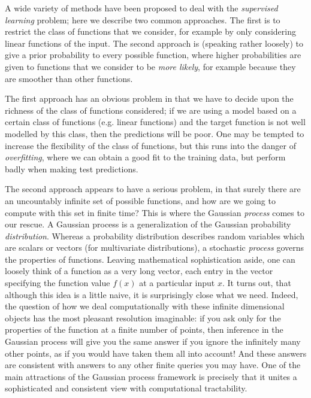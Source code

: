 \documentclass{article} %
\begin{document}
A wide variety of methods have been proposed to deal with the \textit{supervised learning} problem; here we describe two common approaches. The first is to restrict the class of functions that we consider, for example by only considering linear functions of the input. The second approach is (speaking rather loosely) to give a prior probability to every possible function, where higher probabilities are given to functions that we consider to be \textit{more likely}, for example because they are smoother than other functions.

The first approach has an obvious problem in that we have to decide upon the richness of the class of functions considered; if we are using a model based on a certain class of functions (e.g. linear functions) and the target function is not well modelled by this class, then the predictions will be poor. One may be tempted to increase the flexibility of the class of functions, but this runs into the danger of \textit{overfitting}, where we can obtain a good fit to the training data, but perform badly when making test predictions.

The second approach appears to have a serious problem, in that surely there are an uncountably infinite set of possible functions, and how are we going to compute with this set in finite time? This is where the Gaussian \textit{process} comes to our rescue. A Gaussian process is a generalization of the Gaussian probability \textit{distribution}. Whereas a probability distribution describes random variables which are scalars or vectors (for multivariate distributions), a stochastic \textit{process} governs the properties of functions. Leaving mathematical sophistication aside, one can loosely think of a function as a very long vector, each entry in the vector specifying the function value $f(x)$ at a particular input $x$. It turns out, that although this idea is a little naive, it is surprisingly close what we need. Indeed, the question of how we deal computationally with these infinite dimensional objects has the most pleasant resolution imaginable: if you ask only for the properties of the function at a finite number of points, then inference in the Gaussian process will give you the same answer if you ignore the infinitely many other points, as if you would have taken them all into account! And these answers are consistent with answers to any other finite queries you may have. One of the main attractions of the Gaussian process framework is precisely that it unites a sophisticated and consistent view with computational tractability.
\end{document}
